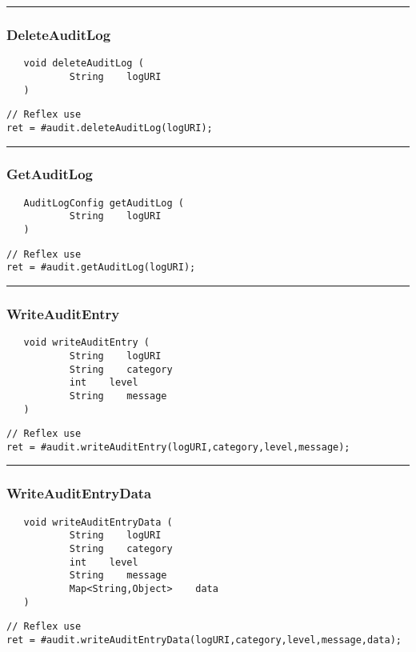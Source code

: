 \rule{15cm}{2pt}
\subsubsection{DeleteAuditLog}
\label{Api:DeleteAuditLog}
\begin{verbatim}
   void deleteAuditLog (
           String    logURI
   )
\end{verbatim}
\begin{lstlisting}[language=reflex]
// Reflex use
ret = #audit.deleteAuditLog(logURI);
\end{lstlisting}



\rule{15cm}{2pt}
\subsubsection{GetAuditLog}
\label{Api:GetAuditLog}
\begin{verbatim}
   AuditLogConfig getAuditLog (
           String    logURI
   )
\end{verbatim}
\begin{lstlisting}[language=reflex]
// Reflex use
ret = #audit.getAuditLog(logURI);
\end{lstlisting}



\rule{15cm}{2pt}
\subsubsection{WriteAuditEntry}
\label{Api:WriteAuditEntry}
\begin{verbatim}
   void writeAuditEntry (
           String    logURI
           String    category
           int    level
           String    message
   )
\end{verbatim}
\begin{lstlisting}[language=reflex]
// Reflex use
ret = #audit.writeAuditEntry(logURI,category,level,message);
\end{lstlisting}



\rule{15cm}{2pt}
\subsubsection{WriteAuditEntryData}
\label{Api:WriteAuditEntryData}
\begin{verbatim}
   void writeAuditEntryData (
           String    logURI
           String    category
           int    level
           String    message
           Map<String,Object>    data
   )
\end{verbatim}
\begin{lstlisting}[language=reflex]
// Reflex use
ret = #audit.writeAuditEntryData(logURI,category,level,message,data);
\end{lstlisting}



